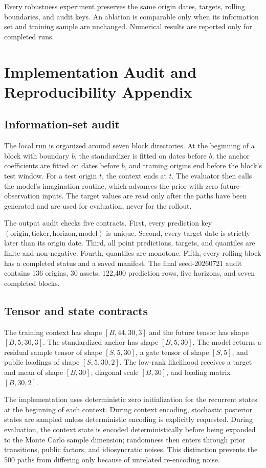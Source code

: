 \documentclass[11pt]{article}
\begin{document}
Every robustness experiment preserves the same origin dates, targets, rolling boundaries, and audit keys. An ablation is comparable only when its information set and training sample are unchanged. Numerical results are reported only for completed runs.

\section{Implementation Audit and Reproducibility Appendix}
\subsection{Information-set audit}
The local run is organized around seven block directories. At the beginning of a block with boundary $b$, the standardizer is fitted on dates before $b$, the anchor coefficients are fitted on dates before $b$, and training origins end before the block's test window. For a test origin $t$, the context ends at $t$. The evaluator then calls the model's imagination routine, which advances the prior with zero future-observation inputs. The target values are read only after the paths have been generated and are used for evaluation, never for the rollout.

The output audit checks five contracts. First, every prediction key $(\text{origin},\text{ticker},\text{horizon},\text{model})$ is unique. Second, every target date is strictly later than its origin date. Third, all point predictions, targets, and quantiles are finite and non-negative. Fourth, quantiles are monotone. Fifth, every rolling block has a completed status and a saved manifest. The final seed-20260721 audit contains 136 origins, 30 assets, 122,400 prediction rows, five horizons, and seven completed blocks.

\subsection{Tensor and state contracts}
The training context has shape $[B,44,30,3]$ and the future tensor has shape $[B,5,30,3]$. The standardized anchor has shape $[B,5,30]$. The model returns a residual sample tensor of shape $[S,5,30]$, a gate tensor of shape $[S,5]$, and public loadings of shape $[S,5,30,2]$. The low-rank likelihood receives a target and mean of shape $[B,30]$, diagonal scale $[B,30]$, and loading matrix $[B,30,2]$.

The implementation uses deterministic zero initialization for the recurrent states at the beginning of each context. During context encoding, stochastic posterior states are sampled unless deterministic encoding is explicitly requested. During evaluation, the context state is encoded deterministically before being expanded to the Monte Carlo sample dimension; randomness then enters through prior transitions, public factors, and idiosyncratic noises. This distinction prevents the 500 paths from differing only because of unrelated re-encoding noise.
\end{document}
